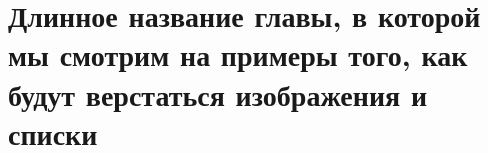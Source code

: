 \chapter{Длинное название главы, в которой мы смотрим на примеры того, как будут верстаться изображения и списки} \label{chapt2}


\clearpage
